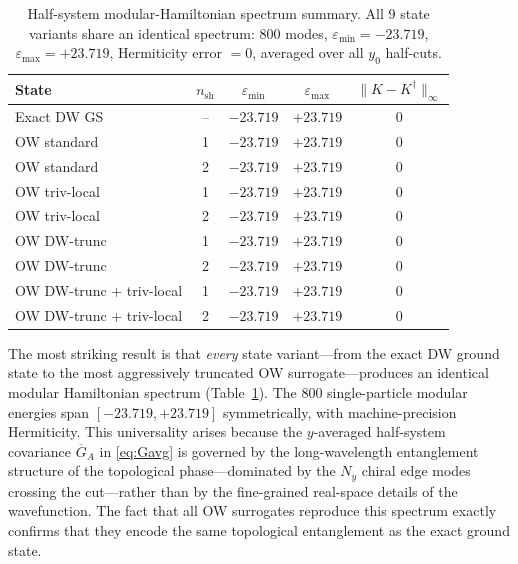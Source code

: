 \documentclass[aps,prb,twocolumn,superscriptaddress,floatfix]{revtex4-2}
\newcommand{\Ny}{N_y}
\begin{document}
\begin{table}[t]
\caption{Half-system modular-Hamiltonian spectrum summary.
  All 9 state variants share an identical spectrum: 800 modes,
  $\varepsilon_{\min} = -23.719$, $\varepsilon_{\max} = +23.719$,
  Hermiticity error $= 0$, averaged over all $y_0$ half-cuts.}
\label{tab:spectra}
\begin{ruledtabular}
\begin{tabular}{lcccc}
  State & $n_\mathrm{sh}$ & $\varepsilon_{\min}$ & $\varepsilon_{\max}$
        & $\|K - K^\dagger\|_\infty$ \\
  \hline
  Exact DW GS             & --  & $-23.719$ & $+23.719$ & $0$ \\
  OW standard             &  1  & $-23.719$ & $+23.719$ & $0$ \\
  OW standard             &  2  & $-23.719$ & $+23.719$ & $0$ \\
  OW triv-local           &  1  & $-23.719$ & $+23.719$ & $0$ \\
  OW triv-local           &  2  & $-23.719$ & $+23.719$ & $0$ \\
  OW DW-trunc             &  1  & $-23.719$ & $+23.719$ & $0$ \\
  OW DW-trunc             &  2  & $-23.719$ & $+23.719$ & $0$ \\
  OW DW-trunc + triv-local&  1  & $-23.719$ & $+23.719$ & $0$ \\
  OW DW-trunc + triv-local&  2  & $-23.719$ & $+23.719$ & $0$ \\
\end{tabular}
\end{ruledtabular}
\end{table}

The most striking result is that \emph{every} state variant—from the exact
DW ground state to the most aggressively truncated OW surrogate—produces an
identical modular Hamiltonian spectrum (Table~\ref{tab:spectra}).  The 800
single-particle modular energies span $[-23.719, +23.719]$ symmetrically,
with machine-precision Hermiticity.  This universality arises because the
$y$-averaged half-system covariance $\overline{G}_A$ in \eqref{eq:Gavg} is
governed by the long-wavelength entanglement structure of the topological
phase—dominated by the $\Ny$ chiral edge modes crossing the cut—rather than
by the fine-grained real-space details of the wavefunction.  The fact that
all OW surrogates reproduce this spectrum exactly confirms that they encode
the same topological entanglement as the exact ground state.
\end{document}
